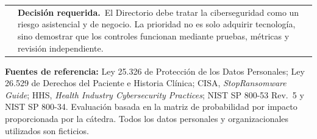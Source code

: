 \documentclass[10pt,a4paper]{article}
\makeatletter
\newcommand{\decisionbox}[1]{%
\noindent\begin{tabularx}{\linewidth}{@{}p{0.2cm} X@{}}
\color{accent}\rule{0.6pt}{\baselineskip} & \small\textbf{Decisión requerida.}\ #1
\end{tabularx}\vspace{1mm}}
\makeatother
\begin{document}
\vspace{3mm}
\decisionbox{El Directorio debe tratar la ciberseguridad como un riesgo asistencial y de negocio. La prioridad no es solo adquirir tecnología, sino demostrar que los controles funcionan mediante pruebas, métricas y revisión independiente.}

\vfill
{\scriptsize\color{muted}
\textbf{Fuentes de referencia:} Ley 25.326 de Protección de los Datos Personales; Ley 26.529 de Derechos del Paciente e Historia Clínica; CISA, \emph{StopRansomware Guide}; HHS, \emph{Health Industry Cybersecurity Practices}; NIST SP 800-53 Rev.\ 5 y NIST SP 800-34. Evaluación basada en la matriz de probabilidad por impacto proporcionada por la cátedra. Todos los datos personales y organizacionales utilizados son ficticios.}
\end{document}
